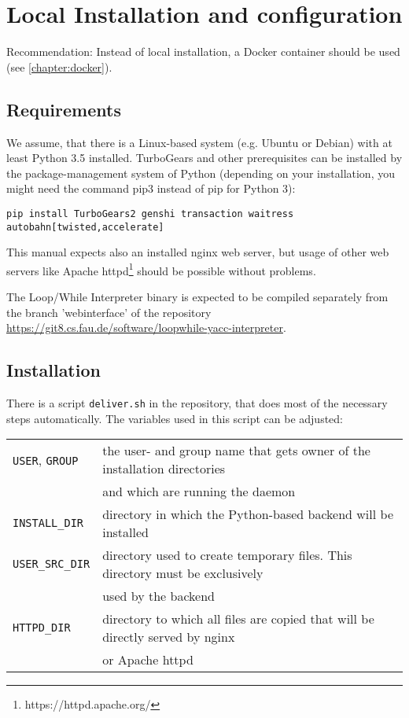 \chapter{Local Installation and configuration}
\label{chapter:installation}
\begin{warning}
Recommendation: Instead of local installation, a Docker container should be used (see \autoref{chapter:docker}).
\end{warning}

\section{Requirements}
We assume, that there is a Linux-based system (e.g. Ubuntu or Debian) with at least Python 3.5 installed. TurboGears and other prerequisites can
be installed by the package-management system of Python (depending on your installation, you might need the command pip3 instead of pip for Python 3):

\begin{verbatim}
pip install TurboGears2 genshi transaction waitress autobahn[twisted,accelerate]
\end{verbatim}

This manual expects also an installed nginx web server, but usage of other web servers like Apache httpd\footnote{https://httpd.apache.org/}
should be possible without problems.

The Loop/While Interpreter binary is expected to be compiled separately from the branch
\mbox{'webinterface'} of the repository\\
\url{https://git8.cs.fau.de/software/loopwhile-yacc-interpreter}.


\section{Installation}
\label{section:installation}
There is a script \verb|deliver.sh| in the repository, that does most of the necessary
steps automatically. The variables used in this script can be adjusted:

\begin{tabular}{@{}l l}
\verb|USER|, \verb|GROUP| & the user- and group name that gets owner of the installation directories\\
                          & and which are running the daemon \\
\verb|INSTALL_DIR|        & directory in which the Python-based backend will be installed \\
\verb|USER_SRC_DIR|       & directory used to create temporary files. This directory must be exclusively\\
                          & used by the backend \\
\verb|HTTPD_DIR|          & directory to which all files are copied that will be directly served by nginx\\
                          & or Apache httpd\\
\end{tabular}

